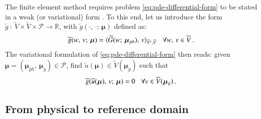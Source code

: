 \documentclass{elsarticle}
\numberwithin{equation}{section}
\theoremstyle{theorem}
\theoremstyle{definition}
\theoremstyle{remark}
\theoremstyle{proposition}
\numberwithin{figure}{section}
\newcommand{\wt}[1]{\widetilde{#1}}
\newcommand{\bg}[1]{\boldsymbol{#1}}
\begin{document}
		The finite element method requires problem \eqref{eq:pde-differential-form} to be stated in a weak (or variational) form \cite{Qua10}. To this end, let us introduce the form $\wt{g} ~ : ~ \wt{V} \times \wt{V} \times \mathcal{P} \rightarrow \mathbb{R}$, with $\wt{g}(\cdot, \, \cdot; \, \bg{\mu})$ defined as:
		\begin{equation*}
			\wt{g}(w, \, v; \, \bg{\mu}) = \langle \wt{G}(w; \, \bg{\mu}_{ph}), \, v \rangle_{\wt{V}',\wt{V}} \hspace*{0.3cm} \forall w, \, v \in \wt{V} \, .
		\end{equation*}
		The variational formulation of \eqref{eq:pde-differential-form} then reads: given $\bg{\mu} = (\bg{\mu}_{ph}, \, \bg{\mu}_g) \in \mathcal{P}$, find $\wt{u}(\bg{\mu}) \in \wt{V}(\bg{\mu}_g)$ such that
		\begin{equation*}
			\label{eq:pde-variational-form}
			\wt{g}(\wt{u}(\bg{\mu}), \, v; \, \bg{\mu}) = 0 \hspace*{0.3cm} \forall v \in \wt{V}(\bg{\mu}_g) \, .
		\end{equation*}
		
		
		
	\subsection{From physical to reference domain}
	\label{section:From physical to reference domain}
	
\end{document}
